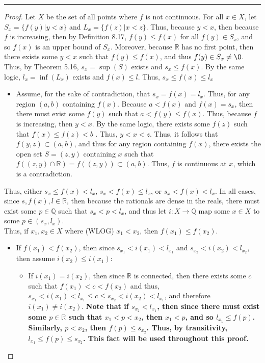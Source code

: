 \documentclass[openany, amssymb, psamsfonts]{amsart}
\newcommand{\bbQ}{\mathbb{Q}}
\newcommand{\bbR}{\mathbb{R}}
\renewcommand{\emptyset}{\O}
\newcommand{\arr}{\longrightarrow}
\theoremstyle{definition}
\numberwithin{equation}{section}
\begin{document}
 \vspace{4pt}     \hrule   \vspace{4pt} \begin{proof}
Let $X$ be the set of all points where $f$ is not continuous. For all $x\in X$, let $S_x = \{f(y)| y<x\}$ and $L_x = \{f(z) | x<z\}$. Thus, because $y<x$, then because $f$ is increasing, then by Definition 8.17, $f(y)\leq f(x)$ for all $f(y)\in S_x$, and so $f(x)$ is an upper bound of $S_x$. Moreover, because $\bbR$ has no first point, then there exists some $y<x$ such that $f(y)\leq f(x)$, and thus $f(y)\in S_x \neq \emptyset$. Thus, by Theorem 5.16, $s_x = \sup(S)$ exists and $s_x\leq f(x)$. By the same logic, $l_x = \inf(L_x)$ exists and $f(x) \leq l$. Thus, $s_x\leq f(x)\leq l_x$
\begin{itemize}
    \item Assume, for the sake of contradiction, that $s_x = f(x) = l_x$. Thus, for any region $(a,b)$ containing $f(x)$. Because $a< f(x)$ and $f(x) = s_x$, then there must exist some $f(y)$ such that $a< f(y)\leq f(x)$. Thus, because $f$ is increasing, then $y< x$. By the same logic, there exists some $f(z)$ such that $f(x) \leq f(z) < b$ . Thus, $y<x<z$. Thus, it follows that $f(y,z)\subset (a,b)$, and thus for any region containing $f(x)$, there exists the open set $S = (z,y)$ containing $x$ such that $f((z,y) \cap \bbR) = f((z,y)) \subset (a,b)$. Thus, $f$ is continuous at $x$, which is a contradiction. 
\end{itemize}
Thus, either $s_x\leq f(x)<l_x$, $s_x<f(x)\leq l_x$, or $s_x< f(x)< l_x$. In all cases, since $s, f(x), l \in \bbR$, then because the rationals are dense in the reals, there must exist some $p\in \bbQ$ such that $s_x< p< l_x$, and thus let $i \colon X \arr \bbQ$ map some $x\in X$ to some $p\in (s_x, l_x)$.\\
Thus, if $x_1, x_2 \in X$ where (WLOG) $x_1 < x_2$, then $f(x_1) \leq f(x_2)$.
\begin{itemize}
    \item If $f(x_1) < f(x_2)$, then since $s_{x_1} < i(x_1)< l_{x_1}$ and $s_{x_2} < i(x_2)< l_{x_2}$, then assume $i(x_2) \leq i(x_1)$:
    \begin{itemize}
        \item If $i(x_1) = i(x_2)$, then since $\bbR$ is connected, then there exists some $c$ such that $f(x_1)<c<f(x_2)$ and thus, $s_{x_1}<i(x_1) < l_{x_1}\leq c \leq s_{x_2} < i(x_2) < l_{x_1}$, and therefore $i(x_1) \neq i(x_2)$. \textbf{Note that if $s_{x_2}<l_{x_1}$, then since there must exist some $p\in \bbR$ such that $x_1<p<x_2$, then $x_1< p$, and so $l_{x_1}\leq f(p)$. Similarly, $p<x_2$, then $f(p)\leq s_{x_2}$. Thus, by transitivity, $l_{x_1}\leq f(p)\leq s_{x_2}$. This fact will be used throughout this proof.}

\end{itemize}
\end{itemize}
\end{proof}
\end{document}
